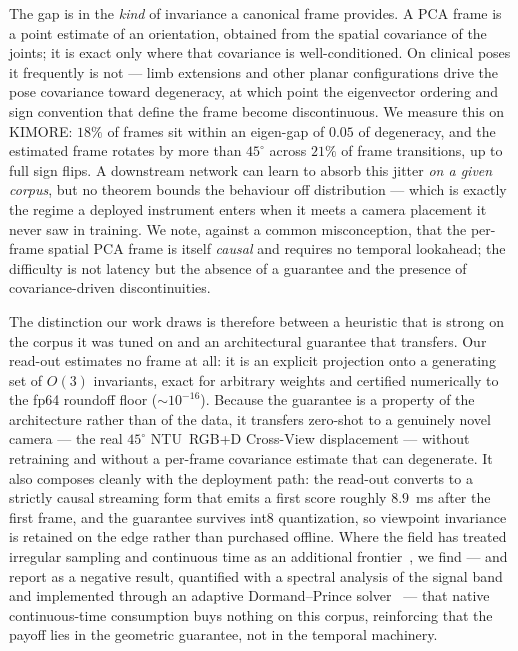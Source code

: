 \documentclass[11pt]{article}
\begin{document}
The gap is in the \emph{kind} of invariance a canonical frame provides. A PCA frame is a point estimate
of an orientation, obtained from the spatial covariance of the joints; it is exact only where that
covariance is well-conditioned. On clinical poses it frequently is not --- limb extensions and other
planar configurations drive the pose covariance toward degeneracy, at which point the eigenvector
ordering and sign convention that define the frame become discontinuous. We measure this on KIMORE:
$18\%$ of frames sit within an eigen-gap of $0.05$ of degeneracy, and the estimated frame rotates by more
than $45^\circ$ across $21\%$ of frame transitions, up to full sign flips. A downstream network can learn
to absorb this jitter \emph{on a given corpus}, but no theorem bounds the behaviour off distribution ---
which is exactly the regime a deployed instrument enters when it meets a camera placement it never saw in
training. We note, against a common misconception, that the per-frame spatial PCA frame is itself
\emph{causal} and requires no temporal lookahead; the difficulty is not latency but the absence of a
guarantee and the presence of covariance-driven discontinuities.

The distinction our work draws is therefore between a heuristic that is strong on the corpus it was tuned
on and an architectural guarantee that transfers. Our read-out estimates no frame at all: it is an
explicit projection onto a generating set of $O(3)$ invariants, exact for arbitrary weights and certified
numerically to the fp64 roundoff floor ($\sim\!10^{-16}$). Because the guarantee is a property of the
architecture rather than of the data, it transfers zero-shot to a genuinely novel camera --- the real
$45^\circ$ NTU~RGB+D Cross-View displacement --- without retraining and without a per-frame covariance
estimate that can degenerate. It also composes cleanly with the deployment path: the read-out converts to
a strictly causal streaming form that emits a first score roughly $8.9$~ms after the first frame, and the
guarantee survives int8 quantization, so viewpoint invariance is retained on the edge rather than
purchased offline. Where the field has treated irregular sampling and continuous time as an additional
frontier~\cite{chen2018neuralode,rubanova2019odernn,kidger2020neuralcde,che2018grud}, we find --- and
report as a negative result, quantified with a spectral analysis of the signal
band~\cite{vanderplas2018lombscargle} and implemented through an adaptive Dormand--Prince
solver~\cite{dormand1980prince} --- that native continuous-time consumption buys nothing on this corpus,
reinforcing that the payoff lies in the geometric guarantee, not in the temporal machinery.
\end{document}
